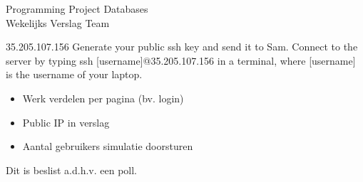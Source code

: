 \documentclass{article}
\newcounter{team}
\begin{document}
	
	\begin{Minutes}{Programming Project Databases \\ Wekelijks Verslag Team }
		\missingNoExcuse{/}
		\missingExcused{/}
		
		\maketitle
		
			35.205.107.156
				Generate your public ssh key and send it to Sam. Connect to the server by typing ssh [username]@35.205.107.156 in a terminal, where [username] is the username of your laptop.
		\begin{itemize}
			\item Werk verdelen per pagina (bv. login)
			\item Public IP in verslag
			\item Aantal gebruikers simulatie doorsturen 
		\end{itemize}
		
			

			
					Dit is beslist a.d.h.v. een poll.
					\begin{Vote}
					\end{Vote}
					

\end{Minutes}
\end{document}

